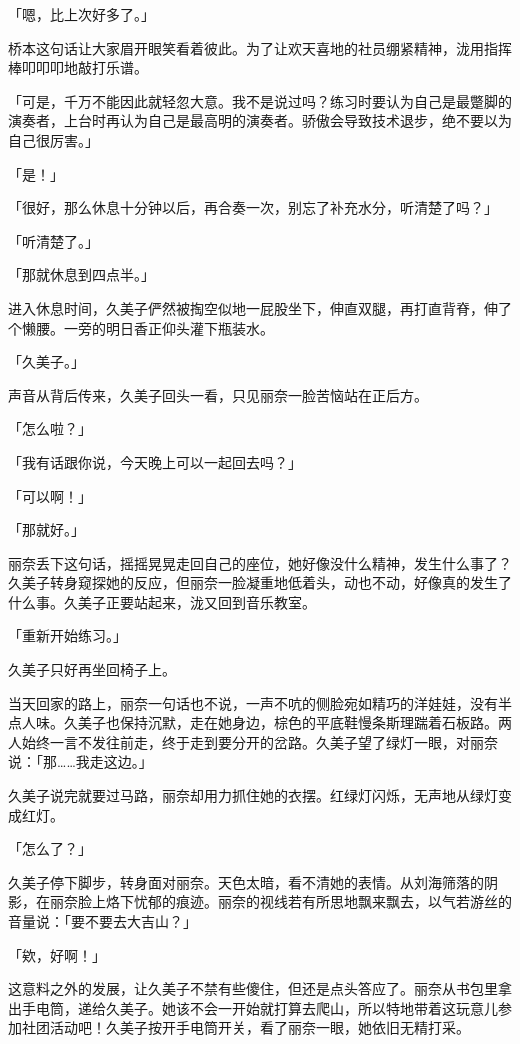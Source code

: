 \documentclass[UTF8]{ctexart}
\begin{document}
    「嗯，比上次好多了。」 

    桥本这句话让大家眉开眼笑看着彼此。为了让欢天喜地的社员绷紧精神，泷用指挥棒叩叩叩地敲打乐谱。 

    「可是，千万不能因此就轻忽大意。我不是说过吗？练习时要认为自己是最蹩脚的演奏者，上台时再认为自己是最高明的演奏者。骄傲会导致技术退步，绝不要以为自己很厉害。」 

    「是！」 

    「很好，那么休息十分钟以后，再合奏一次，别忘了补充水分，听清楚了吗？」 

    「听清楚了。」 

    「那就休息到四点半。」 

    进入休息时间，久美子俨然被掏空似地一屁股坐下，伸直双腿，再打直背脊，伸了个懒腰。一旁的明日香正仰头灌下瓶装水。 

    「久美子。」 

    声音从背后传来，久美子回头一看，只见丽奈一脸苦恼站在正后方。 

    「怎么啦？」 

    「我有话跟你说，今天晚上可以一起回去吗？」 

    「可以啊！」 

    「那就好。」 

    丽奈丢下这句话，摇摇晃晃走回自己的座位，她好像没什么精神，发生什么事了？久美子转身窥探她的反应，但丽奈一脸凝重地低着头，动也不动，好像真的发生了什么事。久美子正要站起来，泷又回到音乐教室。 

    「重新开始练习。」 

    久美子只好再坐回椅子上。 

    当天回家的路上，丽奈一句话也不说，一声不吭的侧脸宛如精巧的洋娃娃，没有半点人味。久美子也保持沉默，走在她身边，棕色的平底鞋慢条斯理踹着石板路。两人始终一言不发往前走，终于走到要分开的岔路。久美子望了绿灯一眼，对丽奈说：「那……我走这边。」 

    久美子说完就要过马路，丽奈却用力抓住她的衣摆。红绿灯闪烁，无声地从绿灯变成红灯。 

    「怎么了？」 

    久美子停下脚步，转身面对丽奈。天色太暗，看不清她的表情。从刘海筛落的阴影，在丽奈脸上烙下忧郁的痕迹。丽奈的视线若有所思地飘来飘去，以气若游丝的音量说：「要不要去大吉山？」 

    「欸，好啊！」 

    这意料之外的发展，让久美子不禁有些傻住，但还是点头答应了。丽奈从书包里拿出手电筒，递给久美子。她该不会一开始就打算去爬山，所以特地带着这玩意儿参加社团活动吧！久美子按开手电筒开关，看了丽奈一眼，她依旧无精打采。 
\end{document}
